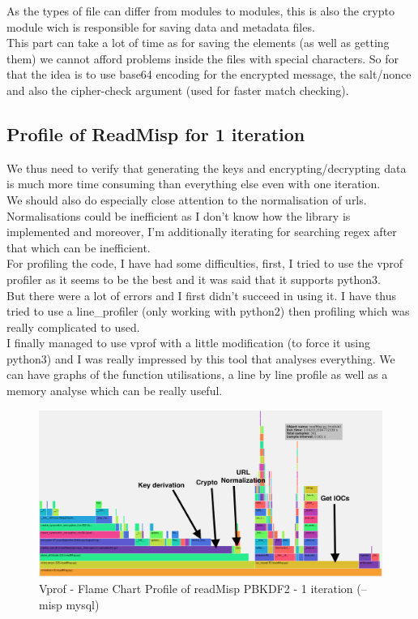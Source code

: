 \documentclass{eplmastersthesis}
\begin{document}
As the types of file can differ from modules to modules, this is also the crypto module wich is responsible for saving data and metadata files.\\
This part can take a lot of time as for saving the elements (as well as getting them) we cannot afford problems inside the files with special characters. So for that the idea is to use base64 encoding for the encrypted message, the salt/nonce and also the cipher-check argument (used for faster match checking).\\


\subsection{Profile of ReadMisp for 1 iteration}
We thus need to verify that generating the keys and encrypting/decrypting data is much more time consuming than everything else even with one iteration.\\
We should also do especially close attention to the normalisation of \gls{url}s. Normalisations could be inefficient as I don't know how the library is implemented and moreover, I'm additionally iterating for searching regex after that which can be inefficient.\\

For profiling the code, I have had some difficulties, first, I tried to use the vprof profiler as it seems to be the best and it was said that it supports python3.\\
But there were a lot of errors and I first didn't succeed in using it. I have thus tried to use a line\_profiler (only working with python2) then profiling which was really complicated to used. \\
I finally managed to use vprof with a little modification (to force it using python3) and I was really impressed by this tool that analyses everything. We can have graphs of the function utilisations, a line by line profile as well as a memory analyse which can be really useful.\\

\begin{figure}[h!]
\begin{center}
	\includegraphics[scale=0.3]{res/profile-1iter}
	\caption{Vprof - Flame Chart Profile of readMisp PBKDF2 - 1 iteration (--misp mysql)}
	\label{profile-readMisp}
\end{center}
\end{figure}
\end{document}
